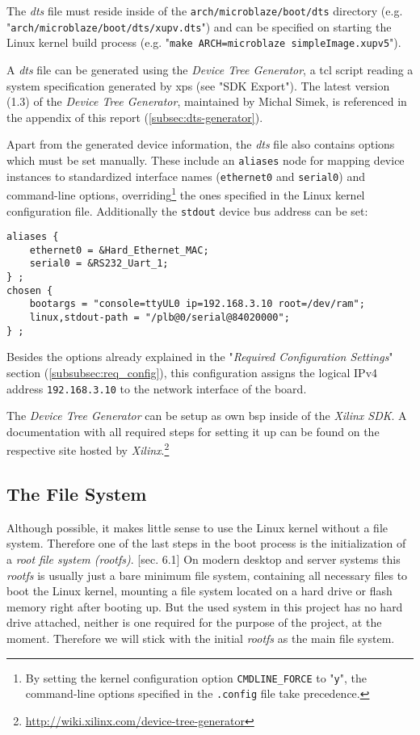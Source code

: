 The \textit{dts} file must reside inside of the \texttt{arch/microblaze/boot/dts} directory (e.g. "\texttt{arch/microblaze/boot/dts/xupv.dts}") and can be specified on starting the Linux kernel build process (e.g. "\texttt{make ARCH=microblaze simpleImage.xupv5}").

A \textit{dts} file can be generated using the \textit{Device Tree Generator}, a \gls{tcl} script reading a system specification generated by \gls{xps} (see "SDK Export"). The latest version (1.3) of the \textit{Device Tree Generator}, maintained by Michal Simek, is referenced in the appendix of this report (\ref{subsec:dts-generator}).

Apart from the generated device information, the \textit{dts} file also contains options which must be set manually. These include an \texttt{aliases} node for mapping device instances to standardized interface names (\texttt{ethernet0} and \texttt{serial0}) and command-line options, overriding\footnote{By setting the kernel configuration option \texttt{CMDLINE\_FORCE} to "\texttt{y}", the command-line options specified in the \texttt{.config} file take precedence.} the ones specified in the Linux kernel configuration file. Additionally the \texttt{stdout} device bus address can be set:

\begin{verbatim}
aliases {
    ethernet0 = &Hard_Ethernet_MAC;
    serial0 = &RS232_Uart_1;
} ;
chosen {
    bootargs = "console=ttyUL0 ip=192.168.3.10 root=/dev/ram";
    linux,stdout-path = "/plb@0/serial@84020000";
} ;
\end{verbatim}

Besides the options already explained in the "\textit{Required Configuration Settings}" section (\ref{subsubsec:req_config}), this configuration assigns the logical IPv4 address \texttt{192.168.3.10} to the network interface of the board.

The \textit{Device Tree Generator} can be setup as own \gls{bsp} inside of the \textit{Xilinx SDK}. A documentation with all required steps for setting it up can be found on the respective site hosted by \textit{Xilinx}.\footnote{\url{http://wiki.xilinx.com/device-tree-generator}}


\subsection{The File System}
\label{subsec:fs}

Although possible, it makes little sense to use the Linux kernel without a file system. Therefore one of the last steps in the boot process is the initialization of a \textit{root file system (rootfs)}. \cite{linuxPrimer}[sec. 6.1] On modern desktop and server systems this \textit{rootfs} is usually just a bare minimum file system, containing all necessary files to boot the Linux kernel, mounting a file system located on a hard drive or flash memory right after booting up. But the used system in this project has no hard drive attached, neither is one required for the purpose of the project, at the moment. Therefore we will stick with the initial \textit{rootfs} as the main file system.

